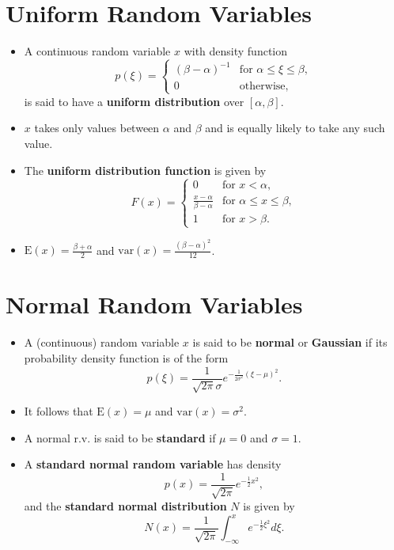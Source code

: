 \section{Uniform Random Variables}

\begin{itemize}[label=\textbullet]
    \item A continuous random variable \( x \) with density function
    \[
    p(\xi) = 
    \begin{cases} 
    (\beta - \alpha)^{-1} & \text{for } \alpha \leq \xi \leq \beta, \\
    0 & \text{otherwise},
    \end{cases}
    \]
    is said to have a \textbf{uniform distribution} over \([ \alpha, \beta ]\).
    \item \( x \) takes only values between \( \alpha \) and \( \beta \) and is equally likely to take any such value.
    \item The \textbf{uniform distribution function} is given by
    \[
    F(x) = 
    \begin{cases} 
    0 & \text{for } x < \alpha, \\
    \frac{x - \alpha}{\beta - \alpha} & \text{for } \alpha \leq x \leq \beta, \\
    1 & \text{for } x > \beta.
    \end{cases}
    \]
    \item \(\text{E}(x) = \frac{\beta + \alpha}{2}\) and \(\text{var}(x) = \frac{(\beta - \alpha)^2}{12}\).
\end{itemize}

\section{Normal Random Variables}

\begin{itemize}[label=\textbullet]
    \item A (continuous) random variable \( x \) is said to be \textbf{normal} or \textbf{Gaussian} if its probability density function is of the form
    \[
    p(\xi) = \frac{1}{\sqrt{2\pi}\sigma} e^{-\frac{1}{2\sigma^2} (\xi - \mu)^2}.
    \]
    \item It follows that \( \text{E}(x) = \mu \) and \( \text{var}(x) = \sigma^2 \).
    \item A normal r.v. is said to be \textbf{standard} if \( \mu = 0 \) and \( \sigma = 1 \).
    \item A \textbf{standard normal random variable} has density
    \[
    p(x) = \frac{1}{\sqrt{2\pi}} e^{-\frac{1}{2} x^2},
    \]
    and the \textbf{standard normal distribution} \( N \) is given by
    \[
    N(x) = \frac{1}{\sqrt{2\pi}} \int_{-\infty}^x e^{-\frac{1}{2} \xi^2} d\xi.
    \]
\end{itemize}



